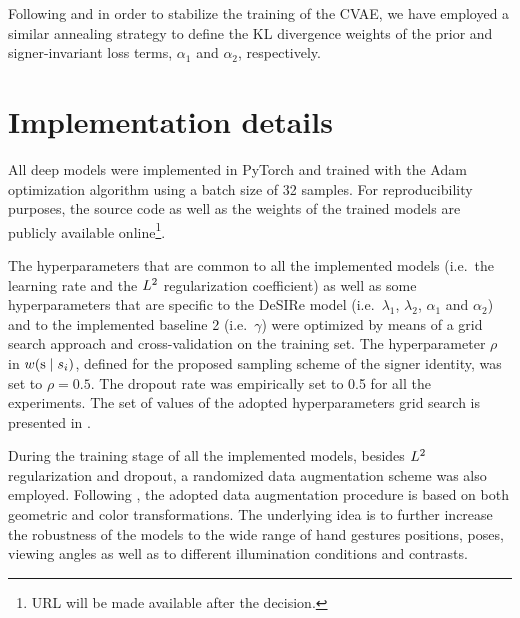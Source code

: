Following \citet{Bowman2015} and in order to stabilize the training of the CVAE, we have employed a similar annealing strategy to define the KL divergence weights of the prior and signer-invariant loss terms, $\alpha_1$ and $\alpha_2$, respectively.

\section{Implementation details}
\label{sec:desire_imp_details}
All deep models were implemented in PyTorch and trained with the Adam optimization algorithm using a batch size of 32 samples. For reproducibility purposes, the source code as well as the weights of the trained models are publicly available online\footnote{URL will be made available after the decision.}.

The hyperparameters that are common to all the implemented models (i.e.\ the learning rate and the $L^2$ regularization coefficient) as well as some hyperparameters that are specific to the DeSIRe model (i.e.\ $\lambda_{1}$, $\lambda_{2}$, $\alpha_{1}$ and $\alpha_{2}$) and to the implemented baseline 2 (i.e.\ $\gamma$) were optimized by means of a grid search approach and cross-validation on the training set. The hyperparameter $\rho$ in $w({\textnormal{s}} \mid s_{i})$, defined for the proposed sampling scheme of the signer identity, was set to $\rho=0.5$. The dropout rate was empirically set to 0.5 for all the experiments. The set of values of the adopted hyperparameters grid search is presented in .

During the training stage of all the implemented models, besides $L^2$ regularization and dropout, a randomized data augmentation scheme was also employed. Following \citet{Ferreira2018}, the adopted data augmentation procedure is based on both geometric and color transformations. The underlying idea is to further increase the robustness of the models to the wide range of hand gestures positions, poses, viewing angles as well as to different illumination conditions and contrasts.

